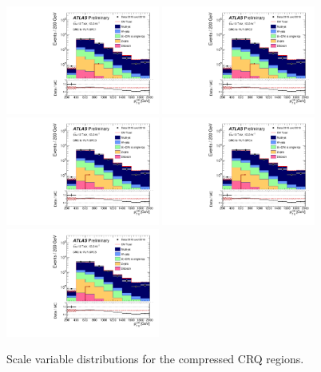 \begin{figure}[tbph]
\begin{center}
\includegraphics[width=0.45\textwidth]{figures/ATLAS-CONF-2016-078_INT/N-1Plots/AtlasStyle/Preliminary/CRQ_SRJigsawSRC1_LastCut_CRQ_minusone}
\includegraphics[width=0.45\textwidth]{figures/ATLAS-CONF-2016-078_INT/N-1Plots/AtlasStyle/Preliminary/CRQ_SRJigsawSRC2_LastCut_CRQ_minusone}
\includegraphics[width=0.45\textwidth]{figures/ATLAS-CONF-2016-078_INT/N-1Plots/AtlasStyle/Preliminary/CRQ_SRJigsawSRC3_LastCut_CRQ_minusone}
\includegraphics[width=0.45\textwidth]{figures/ATLAS-CONF-2016-078_INT/N-1Plots/AtlasStyle/Preliminary/CRQ_SRJigsawSRC4_LastCut_CRQ_minusone}
\includegraphics[width=0.45\textwidth]{figures/ATLAS-CONF-2016-078_INT/N-1Plots/AtlasStyle/Preliminary/CRQ_SRJigsawSRC5_LastCut_CRQ_minusone}
\end{center}
\caption{Scale variable distributions for the compressed CRQ regions.}
\label{fig:CRQ_SRJigsawSRC1_LastCut_CRQ_minusone}
\end{figure}

